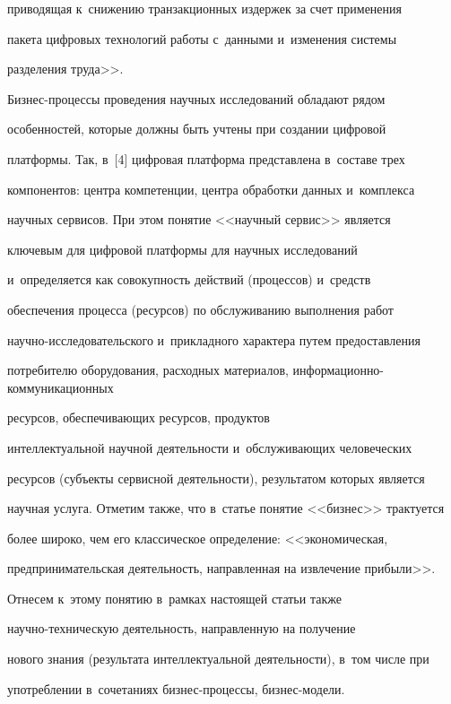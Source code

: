 приводящая к~снижению транзакционных издержек за счет применения 


пакета цифровых технологий работы с~данными и~изменения системы 


разделения труда>>.


     


     Бизнес-процессы проведения научных исследований обладают рядом 


особенностей, которые должны быть учтены при создании цифровой 


платформы. Так, в~[4] цифровая платформа представлена в~составе трех 


компонентов: центра компетенции, центра обработки данных и~комплекса 


научных сервисов. При этом понятие <<научный сервис>> является 


ключевым для цифровой платформы для научных исследований 


и~определяется как совокупность действий (процессов) и~средств 


обеспечения процесса (ресурсов) по обслуживанию выполнения работ 


научно-исследовательского и~прикладного характера путем предоставления 


потребителю оборудования, расходных материалов, ин\-фор\-ма\-ци\-он\-но-ком\-му\-ни\-ка\-ци\-он\-ных 


ресурсов, обеспечивающих ресурсов, продуктов 


интеллектуальной научной деятельности и~обслуживающих человеческих 


ресурсов (субъекты сервисной деятельности), результатом которых является 


научная услуга. Отметим также, что в~статье понятие <<бизнес>> трактуется 


более широко, чем его классическое определение: <<экономическая, 


предпринимательская деятельность, направленная на извлечение прибыли>>. 


Отнесем к~этому понятию в~рамках настоящей статьи также  


на\-уч\-но-тех\-ни\-че\-скую деятельность, направленную на получение 


нового знания (результата интеллектуальной деятельности), в~том числе при 


употреблении в~сочетаниях бизнес-процессы, биз\-нес-мо\-дели.


